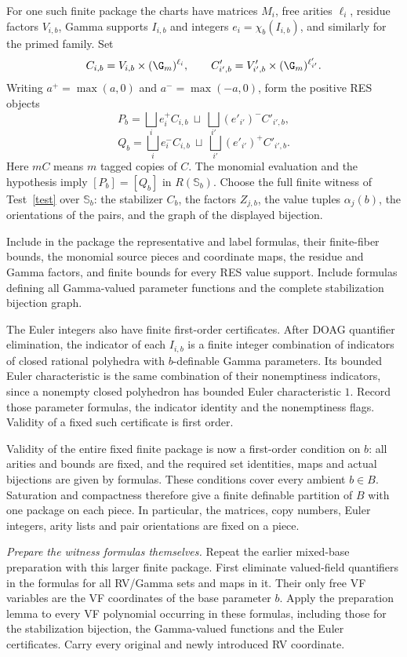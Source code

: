 For one such finite package the charts have matrices $M_i$,
free arities $\ell_i$, residue factors $V_{i,b}$,
Gamma supports $I_{i,b}$ and integers
$e_i=\chi_b(I_{i,b})$, and similarly for the primed family.
Set
\[
 C_{i,b}=V_{i,b}\times(\G_m)^{\ell_i},
 \qquad C'_{i',b}=V'_{i',b}\times(\G_m)^{\ell'_{i'}}.
\]
Writing $a^+=\max(a,0)$ and $a^-=\max(-a,0)$, form the
positive RES objects
\[
 P_b=\bigsqcup_i e_i^+ C_{i,b}
       \ \sqcup\ \bigsqcup_{i'}(e'_{i'})^- C'_{i',b},
\]
\[
 Q_b=\bigsqcup_i e_i^- C_{i,b}
       \ \sqcup\ \bigsqcup_{i'}(e'_{i'})^+ C'_{i',b}.
\]
Here $mC$ means $m$ tagged copies of $C$.
The monomial evaluation and the hypothesis imply
$[P_b]=[Q_b]$ in $R(\mathbb S_b)$.
Choose the full finite witness of Test~\ref{test} over
$\mathbb S_b$: the stabilizer $C_b$, the factors $Z_{j,b}$,
the value tuples $\alpha_j(b)$, the orientations of the
pairs, and the graph of the displayed bijection.

Include in the package the representative and label
formulas, their finite-fiber bounds, the monomial source
pieces and coordinate maps, the residue and Gamma factors,
and finite bounds for every RES value support.
Include formulas defining all Gamma-valued parameter
functions and the complete stabilization bijection graph.

The Euler integers also have finite first-order certificates.
After DOAG quantifier elimination, the indicator of each
$I_{i,b}$ is a finite integer combination of indicators
of closed rational polyhedra with $b$-definable Gamma
parameters. Its bounded Euler characteristic is the
same combination of their nonemptiness indicators,
since a nonempty closed polyhedron has bounded Euler
characteristic $1$.
Record those parameter formulas, the indicator identity
and the nonemptiness flags.
Validity of a fixed such certificate is first order.

Validity of the entire fixed finite package is now a
first-order condition on $b$: all arities and bounds are
fixed, and the required set identities, maps and actual
bijections are given by formulas.
These conditions cover every ambient $b\in B$.
Saturation and compactness therefore give a finite
definable partition of $B$ with one package on each piece.
In particular, the matrices, copy numbers, Euler integers,
arity lists and pair orientations are fixed on a piece.

\medskip
\noindent\emph{Prepare the witness formulas themselves.}
Repeat the earlier mixed-base preparation with this larger
finite package.
First eliminate valued-field quantifiers in the formulas
for all RV/Gamma sets and maps in it.
Their only free VF variables are the VF coordinates of
the base parameter $b$. Apply the preparation lemma to
every VF polynomial occurring in these formulas, including
those for the stabilization bijection, the Gamma-valued
functions and the Euler certificates.
Carry every original and newly introduced RV coordinate.

